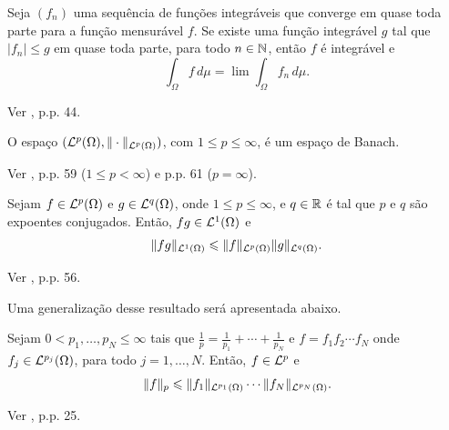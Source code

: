 \begin{tbox} \label{thm:teorema-da-convergencia-dominada}
    Seja $(f_n)$ uma sequência de funções integráveis que converge em quase toda parte para a função mensurável $f$.
    Se existe uma função integrável $g$ tal que $|f_n| \leqslant g$ em quase toda parte, para todo $n \in \mathbb{N}$, então $f$ é integrável e
    \[
        \int_\Omega f \,d\mu = \lim \int_\Omega f_n \,d\mu.
    \]
\end{tbox}
\begin{prf}
    Ver \cite{bartle-measure.theory}, p.p. 44.
\end{prf}

\begin{tbox} \label{thm:lp-completo-pre}
    O espaço $(\mathcal{L}^p(\Omega), \Vert \cdot \Vert_{\mathcal{L}^p(\Omega)})$, com $1 \leqslant p \leqslant \infty$, é um espaço de Banach.\footnotemark
\end{tbox}
\begin{prf}
    Ver \cite{bartle-measure.theory}, p.p. 59 ($1 \leqslant p < \infty$) e p.p. 61 ($p = \infty$).
\end{prf}


\begin{tbox} \label{thm:pre-desigualdade-de-holder}
    Sejam $f \in \mathcal{L}^p(\Omega)$ e $g \in \mathcal{L}^q(\Omega)$, onde $1 \leqslant p \leqslant \infty$, e $q \in \mathbb{R}$ é tal que $p$ e $q$ são expoentes conjugados\footnotemark.
    Então, $fg \in \mathcal{L}^1(\Omega)$ e
    \[
        \Vert fg \Vert_{\mathcal{L}^1(\Omega)} \leqslant \Vert f \Vert_{\mathcal{L}^p(\Omega)} \Vert g \Vert_{\mathcal{L}^q(\Omega)}.
    \]
\end{tbox}
\begin{prf}
    Ver \cite{bartle-measure.theory}, p.p. 56.
\end{prf}


Uma generalização desse resultado será apresentada abaixo.

\begin{tbox} \label{thm:pre-desigualdade-de-holder-gen}
    Sejam $0 < p_1,\dots,p_N \leqslant \infty$ tais que $\frac{1}{p} = \frac{1}{p_1} + \cdots + \frac{1}{p_N}$ e $f = f_1 f_2 \cdots f_N$ onde $f_j \in \mathcal{L}^{p_j}(\Omega)$, para todo $j = 1,\dots,N$. 
    Então, $f \in \mathcal{L}^p$ e 
    \[
        \Vert f \Vert_p \leqslant \Vert f_1 \Vert_{\mathcal{L}^{p_1}(\Omega)} \cdots \Vert f_N \Vert_{\mathcal{L}^{p_N}(\Omega)}.
    \] 
\end{tbox}
\begin{prf}
    Ver \cite{adams-sobolev}, p.p. 25.
\end{prf}


